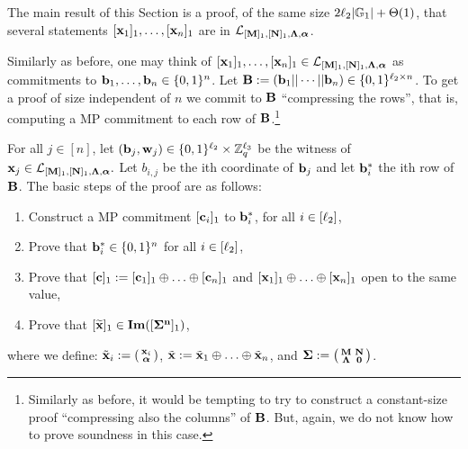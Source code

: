 The main result of this Section is a proof, of the same size $2{\ell_2}|\mathbb{G}_1|+\Theta(1)$, that several statements $[\mathbf{x}_1]_1,\ldots,[\mathbf{x}_n]_1$ are in $\mathcal{L}_{[\mathbf{{M}}]_1,[\mathbf{{N}}]_1,\mathbf{{\Lambda}},{\boldsymbol \alpha}}$.

Similarly as before, one may think of $[\mathbf{x}_1]_1,\ldots,[\mathbf{x}_n]_1\in{\mathcal{L}_{[\mathbf{{M}}]_1,[\mathbf{{N}}]_1,\mathbf{{\Lambda}},{\boldsymbol \alpha}}}$ as commitments to $\mathbf{b}_1,\ldots,\mathbf{b}_n\in\{0,1\}^n$. Let $\mathbf{{B}}:=(\mathbf{b}_1||\cdots||\mathbf{b}_n)\in\{0,1\}^{{\ell_2}\times n}$. To get a proof of size independent of $n$ we commit to $\mathbf{{B}}$ ``compressing the rows'', that is, computing a MP commitment to each row of $\mathbf{{B}}$.\footnote{Similarly as before, it would be tempting to try to construct a constant-size proof ``compressing also the columns'' of $\mathbf{{B}}$. But, again, we do not know how to prove soundness in this case.}
 

For all $j \in [n]$, let $(\mathbf{b}_j,\mathbf{w}_j) \in \{0,1\}^{{\ell_2}} \times \mathbb{Z}_q^{{\ell_3}}$ be the witness of $\mathbf{x}_j \in \mathcal{L}_{[\mathbf{{M}}]_1,[\mathbf{{N}}]_1,\mathbf{{\Lambda}},{\boldsymbol \alpha}}.$ Let $b_{i,j}$ be the ith coordinate of $\mathbf{b}_j$ and let 
 $\mathbf{b}^*_{i}$ the ith row of $\mathbf{{B}}$. The basic steps of the proof are as follows:
\begin{enumerate}
\item Construct a MP commitment $[\mathbf{c}_i]_1$ to $\mathbf{b}^*_i$, for all $i \in [{\ell_2}]$,
\item Prove that $\mathbf{b}^*_i \in \{0,1\}^{n}$ for all $i \in [{\ell_2}]$, 
\item Prove that $[\mathbf{c}]_1:=[\mathbf{c}_1]_1 \oplus \ldots \oplus [\mathbf{c}_n]_1$ and $[\mathbf{x}_1]_1 \oplus \ldots \oplus [\mathbf{x}_n]_1$ open to the same value,
\item Prove that $[\widetilde{\mathbf{x}}]_1 \in \mathbf{Im}([\mathbf{{\Sigma^n}}]_1)$, 
\end{enumerate}
where we define: $\tilde{\mathbf{x}}_i:=  \left(\begin{smallmatrix}
    \mathbf{x}_i\\
    {\boldsymbol \alpha}
\end{smallmatrix}\right)$, $\tilde{\mathbf{x}}:= \tilde{\mathbf{x}}_1 \oplus 
\ldots \oplus  \tilde{\mathbf{x}}_n$, and
$\mathbf{{\Sigma}}:=\left(\begin{smallmatrix}
    \mathbf{{M}}       & \mathbf{{N}}\\
    \mathbf{{\Lambda}} & \mathbf{{0}}
    \end{smallmatrix}\right)$. 

